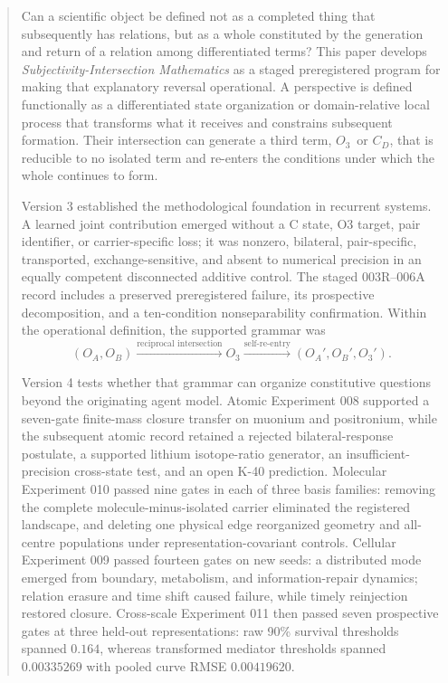 \documentclass[11pt,a4paper]{article}
\newcommand{\OA}{\ensuremath{O_{A}}}
\newcommand{\OB}{\ensuremath{O_{B}}}
\newcommand{\Othree}{\ensuremath{O_{3}}}
\begin{document}
\begin{abstract}
Can a scientific object be defined not as a completed thing that subsequently has relations, but as a whole constituted by the generation and return of a relation among differentiated terms? This paper develops \emph{Subjectivity-Intersection Mathematics} as a staged preregistered program for making that explanatory reversal operational. A perspective is defined functionally as a differentiated state organization or domain-relative local process that transforms what it receives and constrains subsequent formation. Their intersection can generate a third term, \Othree\ or $C_D$, that is reducible to no isolated term and re-enters the conditions under which the whole continues to form.

Version 3 established the methodological foundation in recurrent systems. A learned joint contribution emerged without a C state, O3 target, pair identifier, or carrier-specific loss; it was nonzero, bilateral, pair-specific, transported, exchange-sensitive, and absent to numerical precision in an equally competent disconnected additive control. The staged 003R--006A record includes a preserved preregistered failure, its prospective decomposition, and a ten-condition nonseparability confirmation. Within the operational definition, the supported grammar was
\[
  (\OA,\OB) \xrightarrow{\text{reciprocal intersection}} \Othree
  \xrightarrow{\text{self-re-entry}} (\OA',\OB',\Othree').
\]

Version 4 tests whether that grammar can organize constitutive questions beyond the originating agent model. Atomic Experiment 008 supported a seven-gate finite-mass closure transfer on muonium and positronium, while the subsequent atomic record retained a rejected bilateral-response postulate, a supported lithium isotope-ratio generator, an insufficient-precision cross-state test, and an open K-40 prediction. Molecular Experiment 010 passed nine gates in each of three basis families: removing the complete molecule-minus-isolated carrier eliminated the registered landscape, and deleting one physical edge reorganized geometry and all-centre populations under representation-covariant controls. Cellular Experiment 009 passed fourteen gates on new seeds: a distributed mode emerged from boundary, metabolism, and information-repair dynamics; relation erasure and time shift caused failure, while timely reinjection restored closure. Cross-scale Experiment 011 then passed seven prospective gates at three held-out representations: raw 90\% survival thresholds spanned $0.164$, whereas transformed mediator thresholds spanned $0.00335269$ with pooled curve RMSE $0.00419620$.


\end{abstract}
\end{document}
